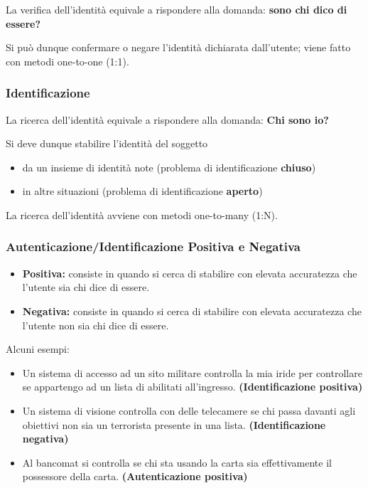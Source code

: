 La verifica dell'identità equivale a rispondere alla domanda: \textbf{sono chi dico di essere?}

Si può dunque confermare o negare l'identità dichiarata dall'utente; viene fatto con metodi one-to-one (1:1).

\subsubsection{Identificazione}

La ricerca dell'identità equivale a rispondere alla domanda: \textbf{Chi sono io?}

Si deve dunque stabilire l'identità del soggetto
\begin{itemize}
    \item da un insieme di identità note (problema di identificazione \textbf{chiuso})
    \item in altre situazioni (problema di identificazione \textbf{aperto})
\end{itemize}
La ricerca dell'identità avviene con metodi one-to-many (1:N).

\subsubsection{Autenticazione/Identificazione Positiva e Negativa}

\begin{itemize}
    \item \textbf{Positiva:} consiste in quando si cerca di stabilire con elevata accuratezza che l'utente sia chi dice di essere.
    \item \textbf{Negativa:} consiste in quando si cerca di stabilire con elevata accuratezza che l'utente non sia chi dice di essere.
\end{itemize}

Alcuni esempi:
\begin{itemize}
    \item Un sistema di accesso ad un sito militare controlla la mia iride
    per controllare se appartengo ad un lista di abilitati all’ingresso. \textbf{(Identificazione positiva)}
    \item Un sistema di visione controlla con delle telecamere se chi
    passa davanti agli obiettivi non sia un terrorista presente in
    una lista. \textbf{(Identificazione negativa)}
    \item Al bancomat si controlla se chi sta usando la carta sia
    effettivamente il possessore della carta. \textbf{(Autenticazione positiva)}
\end{itemize}

